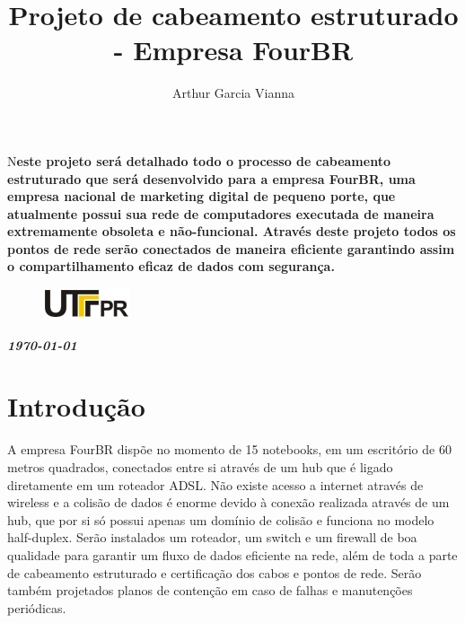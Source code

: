 \documentclass[	DIV=calc,%
							paper=a4,%
							fontsize=12pt,%
							onecolumn]{scrartcl}	 					%
\title{Projeto de cabeamento estruturado - Empresa FourBR}					%
\author{Arthur Garcia Vianna }  	%
\date{}																				%
\newcommand{\initial}[1]{%
     \lettrine[lines=3,lhang=0.3,nindent=0em]{
     				\color{DarkGoldenrod}
     				{\textsf{#1}}}{}}
\begin{document}
\maketitle
\thispagestyle{fancy} 	
\thispagestyle{empty}		%




\initial{N}\textbf{este projeto será detalhado todo o processo de cabeamento estruturado que será desenvolvido para a empresa FourBR, uma empresa nacional de marketing digital de pequeno porte, que atualmente possui sua rede de computadores executada de maneira extremamente obsoleta e não-funcional. Através deste projeto todos os pontos de rede serão conectados de maneira eficiente garantindo assim o compartilhamento eficaz de dados com segurança.}

\begin{figure}
	\centering
	\includegraphics{utfpr}
\end{figure}

\vspace{3cm}
\centerline{\textit{\textbf{\today}}}

\clearpage
    \renewcommand*\listfigurename{Lista de figuras}
\listoffigures






\clearpage
\renewcommand{\contentsname}{Sumário}
\tableofcontents
\clearpage

\section{Introdução}
A empresa FourBR dispõe no momento de 15 notebooks, em um escritório de 60 metros quadrados, conectados entre si através de um hub que é ligado diretamente em um roteador ADSL.
Não existe acesso a internet através de wireless e a colisão de dados é enorme devido à conexão realizada através de um hub, que por si só possui apenas um domínio de colisão e funciona no modelo half-duplex.
Serão instalados um roteador, um switch e um firewall de boa qualidade para garantir um fluxo de dados eficiente na rede, além de toda a parte de cabeamento estruturado e certificação dos cabos e pontos de rede.
Serão também projetados planos de contenção em caso de falhas e manutenções periódicas.
\end{document}
